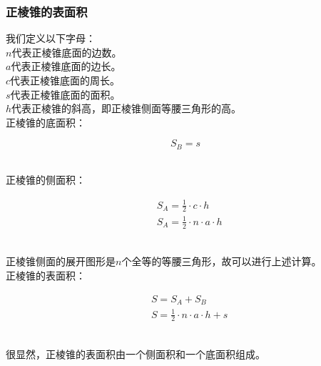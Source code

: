\documentclass[UTF8]{ctexart}
\begin{document}
\newpage

\subsubsection{正棱锥的表面积}
    我们定义以下字母：\\[3mm]
    $n$代表正棱锥底面的边数。\\[3mm]
    $a$代表正棱锥底面的边长。\\[3mm]
    $c$代表正棱锥底面的周长。\\[3mm]
    $s$代表正棱锥底面的面积。\\[3mm]
    $h$代表正棱锥的斜高，即正棱锥侧面等腰三角形的高。\\[6mm]
    正棱锥的底面积：
    \begin{large}
        \begin{equation*}
            S_B=s
        \end{equation*}
    \end{large}\\
    正棱锥的侧面积：
    \begin{large}
        \begin{align*}
            &S_A=\frac{1}{2}\cdot c\cdot h\\[3mm]
            &S_A=\frac{1}{2}\cdot n\cdot a\cdot h
        \end{align*}
    \end{large}\\
    正棱锥侧面的展开图形是$n$个全等的等腰三角形，故可以进行上述计算。\\[8mm]
    正棱锥的表面积：
    \begin{large}
        \begin{align*}
            &S=S_A+S_B\\[3mm]
            &S=\frac{1}{2}\cdot n\cdot a\cdot h+s
        \end{align*}
    \end{large}\\
    很显然，正棱锥的表面积由一个侧面积和一个底面积组成。

\newpage
\end{document}
